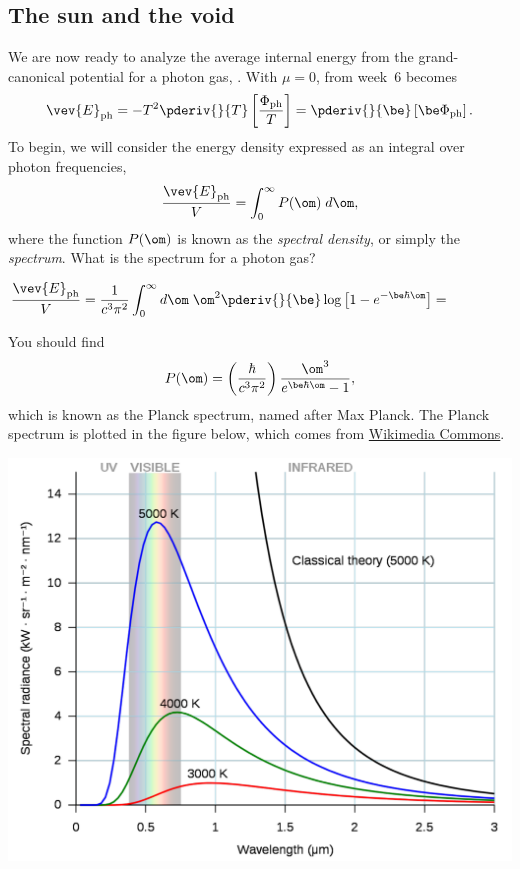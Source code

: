 \subsection{The sun and the void}
We are now ready to analyze the average internal energy from the grand-canonical potential for a photon gas, .
With $\mu = 0$,  from week~6 becomes
\begin{equation*}
  \vev{E}_{\text{ph}} = -T^2 \pderiv{}{T} \left[\frac{\Phi_{\text{ph}}}{T}\right] = \pderiv{}{\be} \left[\be \Phi_{\text{ph}}\right].
\end{equation*}
To begin, we will consider the energy density expressed as an integral over photon frequencies,
\begin{equation*}
  \frac{\vev{E}_{\text{ph}}}{V} = \int_0^{\infty} P(\om) \; d\om,
\end{equation*}
where the function $P(\om)$ is known as the \textit{spectral density}, or simply the \textit{spectrum}.
What is the spectrum for a photon gas?
\begin{mdframed}
  $\displaystyle \frac{\vev{E}_{\text{ph}}}{V} = \frac{1}{c^3 \pi^2} \int_0^{\infty} d\om \; \om^2 \pderiv{}{\be} \log\left[1 - e^{-\be \hbar \om}\right] = $ \\[100 pt]
\end{mdframed}

You should find
\begin{equation}
  \label{eq:Planck_omega}
  P(\om) = \left(\frac{\hbar}{c^3 \pi^2}\right) \frac{\om^3}{e^{\be \hbar \om} - 1},
\end{equation}
which is known as the Planck spectrum, named after Max Planck.
The Planck spectrum is plotted in the figure below, which comes from \href{https://commons.wikimedia.org/wiki/File:Black_body.svg}{Wikimedia Commons}.

\begin{center}\includegraphics[width=\textwidth]{figs/unit08_spectrum.pdf}\end{center}

